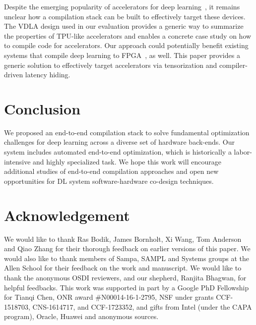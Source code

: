 \documentclass[letterpaper,twocolumn,10pt]{article}
\newcommand{\REV}[1]{#1}
\newcommand{\accel}{VDLA\xspace}
\begin{document}
Despite the emerging popularity of accelerators for deep learning~\cite{Jouppi:TPU,Chen:DaDianNao},
it remains unclear how a compilation stack can be built to effectively target these devices.
The \accel design used in our evaluation provides a generic way to summarize the properties of TPU-like accelerators
and enables a concrete case study on how to compile code for accelerators.
\REV{Our approach could potentially benefit existing systems that
  compile deep learning to FPGA~\cite{dnnweaver:micro16,Umuroglu:FINN}, as well.}
This paper provides a generic solution to effectively target accelerators via tensorization and compiler-driven latency hiding.

\section{Conclusion}
\label{sec:con}
We proposed an end-to-end compilation stack to solve fundamental optimization challenges for deep learning across a diverse set of hardware back-ends.  Our system includes automated end-to-end optimization, which is historically a labor-intensive and highly specialized task.
We hope this  work will encourage additional studies of end-to-end compilation approaches and open new opportunities for DL system software-hardware co-design techniques.

\section*{Acknowledgement}

We would like to thank Ras Bodik, James Bornholt, Xi Wang, Tom Anderson and Qiao Zhang
for their thorough feedback on earlier versions of this paper. We would also like to thank members of Sampa, SAMPL and Systems groups at the Allen School for their feedback on the work and manuscript.
We would like to thank the anonymous OSDI reviewers, and our shepherd, Ranjita Bhagwan, for helpful feedbacks. This work was supported in part by a Google PhD Fellowship for Tianqi Chen,
ONR award \#N00014-16-1-2795, NSF under grants  CCF-1518703, CNS-1614717, and CCF-1723352, and gifts from Intel (under the CAPA program), Oracle, Huawei and anonymous sources.

{\footnotesize 
}
\end{document}
